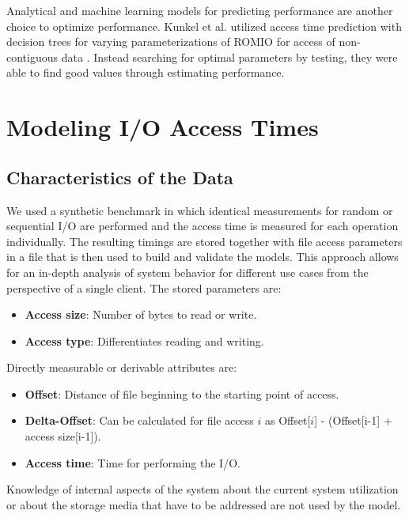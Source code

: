 \documentclass{superfri}
\begin{document}
	Analytical and machine learning models for predicting performance are another choice to optimize performance.
	Kunkel et al. utilized access time prediction with decision trees for varying parameterizations of ROMIO for access of non-contiguous data \cite{UMLTPTPONI15}. 
	Instead searching for optimal parameters by testing, they were able to find good values through estimating performance.
	
	
	\section{Modeling I/O Access Times}
	\label{modeling_access_times}
	\subsection{Characteristics of the Data}
	We used a synthetic benchmark in which identical measurements for random or sequential I/O are performed and the access time is measured for each operation individually.
	The resulting timings are stored together with file access parameters in a file that is then used to build and validate the models.
	This approach allows for an in-depth analysis of system behavior for different use cases from the perspective of a single client.
	The stored parameters are:
	\begin{itemize}
		\item \textbf{Access size}: Number of bytes to read or write.
		\item \textbf{Access type}: Differentiates reading and writing.
	\end{itemize}
	Directly measurable or derivable attributes are:
	\begin{itemize}
		\item \textbf{Offset}: Distance of file beginning to the starting point of access.
		\item \textbf{Delta-Offset}: Can be calculated for file access $i$ as Offset[$i$] - (Offset[i-1] + access size[i-1]).
		\item \textbf{Access time}: Time for performing the I/O.
	\end{itemize}
	Knowledge of internal aspects of the system about the current system utilization or about the storage media that have to be addressed are not used by the model.
	
\end{document}
